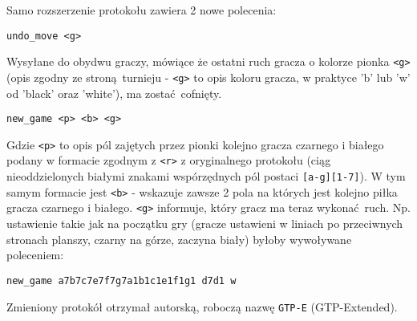 \documentclass[a4paper,12pt]{article}
\begin{document}
Samo rozszerzenie protokołu zawiera 2 nowe polecenia:
\begin{verbatim}undo_move <g>\end{verbatim}
Wysyłane do obydwu graczy, mówiące że ostatni ruch gracza o kolorze pionka \verb|<g>| (opis zgodny ze stroną turnieju - \verb|<g>| to opis koloru
gracza, w praktyce 'b' lub 'w' od 'black' oraz 'white'), ma zostać cofnięty.
\begin{verbatim}new_game <p> <b> <g>\end{verbatim}
Gdzie \verb|<p>| to opis pól zajętych przez pionki kolejno gracza czarnego i białego podany w formacie zgodnym z \verb|<r>| z oryginalnego 
protokołu (ciąg nieoddzielonych białymi znakami wspórzędnych pól postaci \verb|[a-g][1-7]|). W tym samym formacie jest \verb|<b>| - wskazuje
zawsze 2 pola na których jest kolejno piłka gracza czarnego i białego. \verb|<g>| informuje, który gracz ma teraz wykonać ruch. Np. ustawienie
takie jak na początku gry (gracze ustawieni w liniach po przeciwnych stronach planszy, czarny na górze, zaczyna biały) byłoby wywoływane 
poleceniem:
\begin{verbatim}new_game a7b7c7e7f7g7a1b1c1e1f1g1 d7d1 w\end{verbatim}
Zmieniony protokół otrzymał autorską, roboczą nazwę \verb|GTP-E| (GTP-Extended).
\end{document}
